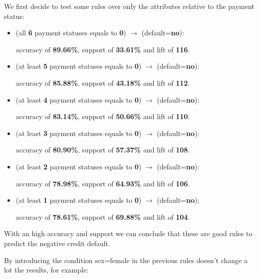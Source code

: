 We first decide to test some rules over only the attributes relative to the payment status:

\begin{itemize}
  \item (all \textbf{6} payment statuses equals to \textbf{0}) $\rightarrow$ (default=\textbf{no}):
  
    \tab accuracy of \textbf{89.66\%}, support of \textbf{33.61\%} and lift of \textbf{116}.
    
  \item (at least \textbf{5} payment statuses equals to \textbf{0}) $\rightarrow$ (default=\textbf{no}):
  
    \tab accuracy of \textbf{85.88\%}, support of \textbf{43.18\%} and lift of \textbf{112}.
    
  \item (at least \textbf{4} payment statuses equals to \textbf{0}) $\rightarrow$ (default=\textbf{no}):
  
    \tab accuracy of \textbf{83.14\%}, support of \textbf{50.66\%} and lift of \textbf{110}.
    
  \item (at least \textbf{3} payment statuses equals to \textbf{0}) $\rightarrow$ (default=\textbf{no}):
  
    \tab accuracy of \textbf{80.90\%}, support of \textbf{57.37\%} and lift of \textbf{108}.
    
  \item (at least \textbf{2} payment statuses equals to \textbf{0}) $\rightarrow$ (default=\textbf{no}):
  
    \tab accuracy of \textbf{78.98\%}, support of \textbf{64.93\%} and lift of \textbf{106}.
    
  \item (at least \textbf{1} payment statuses equals to \textbf{0}) $\rightarrow$ (default=\textbf{no}):
  
    \tab accuracy of \textbf{78.61\%}, support of \textbf{69.88\%} and lift of \textbf{104}.

\end{itemize} 

With an high accuracy and support we can conclude that these are good rules to predict the negative credit default.

\smallskip

By introducing the condition sex=female in the previous rules doesn't change a lot the results, for example:

